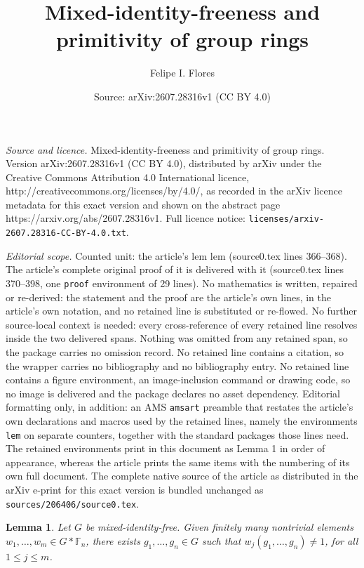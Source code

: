 \documentclass[10pt,a4paper]{amsart}
\title{Mixed-identity-freeness and primitivity of group rings}
\author{Felipe I. Flores}
\date{Source: arXiv:2607.28316v1 (CC BY 4.0)}
\newtheorem{lem}{Lemma}
\begin{document}
\maketitle

\noindent\emph{Source and licence.} Mixed-identity-freeness and primitivity of group rings. Version arXiv:2607.28316v1 (CC BY 4.0), distributed by arXiv under the Creative Commons Attribution 4.0 International licence, http://creativecommons.org/licenses/by/4.0/, as recorded in the arXiv licence metadata for this exact version and shown on the abstract page https://arxiv.org/abs/2607.28316v1. Full licence notice: \texttt{licenses/arxiv-2607.28316-CC-BY-4.0.txt}.\par\smallskip

\noindent\textit{Editorial scope.} Counted unit: the article's lem lem (source0.tex lines 366--368). The article's complete original proof of it is delivered with it (source0.tex lines 370--398, one \texttt{proof} environment of 29 lines). No mathematics is written, repaired or re-derived: the statement and the proof are the article's own lines, in the article's own notation, and no retained line is substituted or re-flowed.  No further source-local context is needed: every cross-reference of every retained line resolves inside the two delivered spans.  Nothing was omitted from any retained span, so the package carries no omission record.  No retained line contains a citation, so the wrapper carries no bibliography and no bibliography entry.  No retained line contains a figure environment, an image-inclusion command or drawing code, so no image is delivered and the package declares no asset dependency.  Editorial formatting only, in addition: an AMS \texttt{amsart} preamble that restates the article's own declarations and macros used by the retained lines, namely the environments \texttt{lem} on separate counters, together with the standard packages those lines need.  The retained environments print in this document as Lemma 1 in order of appearance, whereas the article prints the same items with the numbering of its own full document.  The complete native source of the article as distributed in the arXiv e-print for this exact version is bundled unchanged as \texttt{sources/206406/source0.tex}.
\begin{lem}
    Let $G$ be mixed-identity-free. Given finitely many nontrivial elements $w_1,\ldots,w_m\in G*\mathbb F_n$, there exists $g_1,\ldots,g_n\in G$ such that $w_j(g_1,\ldots,g_n)\not=1$, for all $1\leq j\leq m$.
\end{lem}
\end{document}
